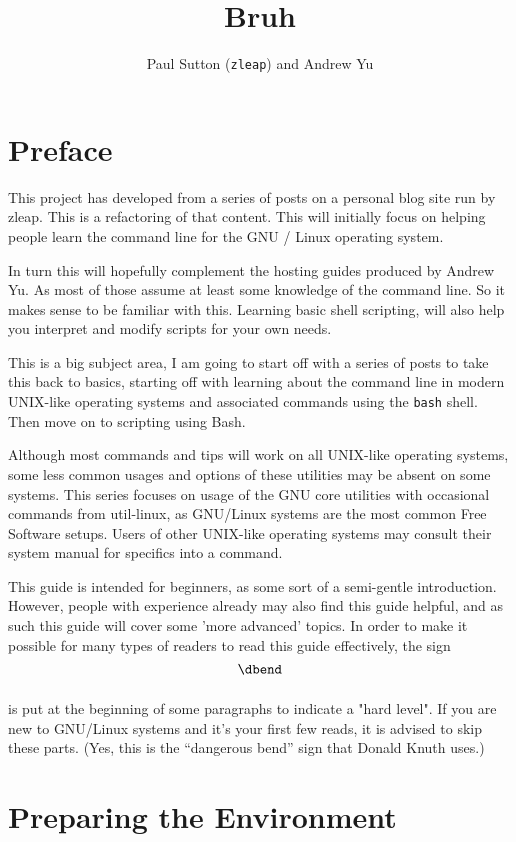 \documentclass{extbook}
\title{Bruh}
\author{Paul Sutton (\texttt{zleap}) and Andrew Yu}
\begin{document}
\maketitle

\frontmatter
\chapter{Preface}

This project has developed from a series of posts on a personal blog site run by zleap. This is a refactoring of that content. This will initially focus on helping people learn the command line for the GNU / Linux operating system.

In turn this will hopefully complement the hosting guides produced by Andrew Yu. As most of those assume at least some knowledge of the command line. So it makes sense to be familiar with this. Learning basic shell scripting, will also help you interpret and modify scripts for your own needs.

This is a big subject area, I am going to start off with a series of posts to take this back to basics, starting off with learning about the command line in modern UNIX-like operating systems and associated commands using the \texttt{bash} shell. Then move on to scripting using Bash.

Although most commands and tips will work on all UNIX-like operating systems, some less common usages and options of these utilities may be absent on some systems. This series focuses on usage of the GNU core utilities with occasional commands from util-linux, as GNU/Linux systems are the most common Free Software setups. Users of other UNIX-like operating systems may consult their system manual for specifics into a command.

This guide is intended for beginners, as some sort of a semi-gentle introduction. However, people with experience already may also find this guide helpful, and as such this guide will cover some 'more advanced' topics. In order to make it possible for many types of readers to read this guide effectively, the  sign
$$\vbox{\hbox{\dbend}\vskip 11pt}$$
is put at the beginning of some paragraphs to indicate a "hard level". If you are new to GNU/Linux systems and it's your first few reads, it is advised to skip these parts. (Yes, this is the ``{dangerous bend}'' sign that Donald Knuth uses.)

\tableofcontents

\mainmatter
\chapter{Preparing the Environment}
\end{document}
